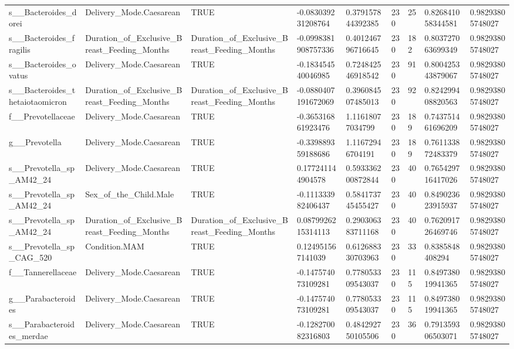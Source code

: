 \begin{longtable}{lllllllll}
s\_\_Bacteroides\_dorei & Delivery\_Mode.Caesarean & TRUE & -0.083039231208764 & 0.379157844392385 & 230 & 25 & 0.826841058344581 & 0.98293805748027 \\
s\_\_Bacteroides\_fragilis & Duration\_of\_Exclusive\_Breast\_Feeding\_Months & Duration\_of\_Exclusive\_Breast\_Feeding\_Months & -0.0998381908757336 & 0.401246796716645 & 230 & 182 & 0.803727063699349 & 0.98293805748027 \\
s\_\_Bacteroides\_ovatus & Delivery\_Mode.Caesarean & TRUE & -0.183454540046985 & 0.724842546918542 & 230 & 91 & 0.800425343879067 & 0.98293805748027 \\
s\_\_Bacteroides\_thetaiotaomicron & Duration\_of\_Exclusive\_Breast\_Feeding\_Months & Duration\_of\_Exclusive\_Breast\_Feeding\_Months & -0.0880407191672069 & 0.396084507485013 & 230 & 92 & 0.824299408820563 & 0.98293805748027 \\
f\_\_Prevotellaceae & Delivery\_Mode.Caesarean & TRUE & -0.365316861923476 & 1.11618077034799 & 230 & 189 & 0.743751461696209 & 0.98293805748027 \\
g\_\_Prevotella & Delivery\_Mode.Caesarean & TRUE & -0.339889359188686 & 1.11672946704191 & 230 & 189 & 0.761133872483379 & 0.98293805748027 \\
s\_\_Prevotella\_sp\_AM42\_24 & Delivery\_Mode.Caesarean & TRUE & 0.177241144904578 & 0.593336200872844 & 230 & 40 & 0.765429716417026 & 0.98293805748027 \\
s\_\_Prevotella\_sp\_AM42\_24 & Sex\_of\_the\_Child.Male & TRUE & -0.111333982406437 & 0.584173745455427 & 230 & 40 & 0.849023623915937 & 0.98293805748027 \\
s\_\_Prevotella\_sp\_AM42\_24 & Duration\_of\_Exclusive\_Breast\_Feeding\_Months & Duration\_of\_Exclusive\_Breast\_Feeding\_Months & 0.0879926215314113 & 0.290306383711168 & 230 & 40 & 0.762091726469746 & 0.98293805748027 \\
s\_\_Prevotella\_sp\_CAG\_520 & Condition.MAM & TRUE & 0.124951567141039 & 0.612688330703963 & 230 & 33 & 0.8385848408294 & 0.98293805748027 \\
f\_\_Tannerellaceae & Delivery\_Mode.Caesarean & TRUE & -0.147574073109281 & 0.778053309543037 & 230 & 115 & 0.849738019941365 & 0.98293805748027 \\
g\_\_Parabacteroides & Delivery\_Mode.Caesarean & TRUE & -0.147574073109281 & 0.778053309543037 & 230 & 115 & 0.849738019941365 & 0.98293805748027 \\
s\_\_Parabacteroides\_merdae & Delivery\_Mode.Caesarean & TRUE & -0.128270082316803 & 0.484292750105506 & 230 & 36 & 0.791359306503071 & 0.98293805748027 \\

\end{longtable}

